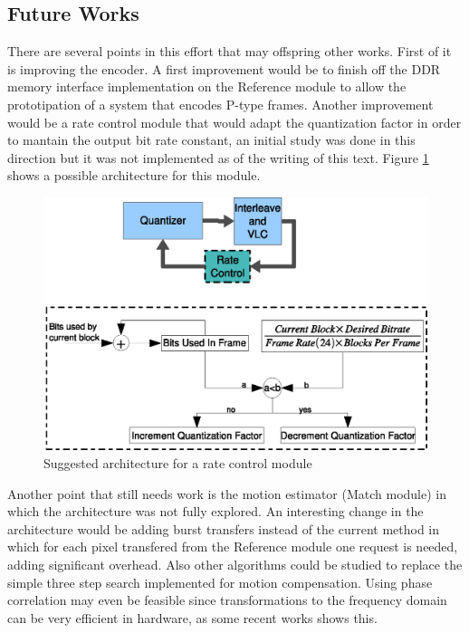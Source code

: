 \documentclass[a4paper, 12pt]{article}
\begin{document}


\subsection{Future Works}

There are several points in this effort that may offspring other works. First of it is improving the encoder. A first improvement would be to finish off the DDR memory interface implementation on the Reference module to allow the prototipation of a system that encodes P-type frames. Another improvement would be a rate control module that would adapt the quantization factor in order to mantain the output bit rate constant, an initial study was done in this direction but it was not implemented as of the writing of this text. Figure \ref{fig:ratecontrol} shows a possible architecture for this module.

\begin{figure}[h]
\centering
\includegraphics{figs/ratecontrol.eps}
\caption{Suggested architecture for a rate control module}
\label{fig:ratecontrol}
\end{figure}

Another point that still needs work is the motion estimator (Match module) in which the architecture was not fully explored. An interesting change in the architecture would be adding burst transfers instead of the current method in which for each pixel transfered from the Reference module one request is needed, adding significant overhead.
Also other algorithms could be studied to replace the simple three step search implemented for motion compensation. Using phase correlation may even be feasible since transformations to the frequency domain can be very efficient in hardware, as some recent works \cite{motion_phase_hw} shows this.
\end{document}
